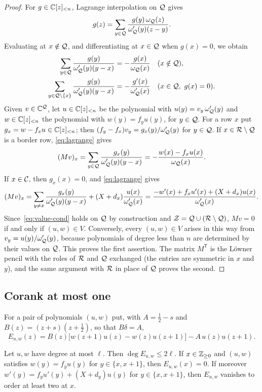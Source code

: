 \begin{proof}
For $g\in\mathbb{C}[z]_{<n}$, Lagrange interpolation on $\mathcal{Q}$ gives
\[
  g(z)=\sum_{y\in\mathcal{Q}}\frac{g(y)\,\omega_{\mathcal{Q}}(z)}{\omega_{\mathcal{Q}}'(y)(z-y)} .
\]
Evaluating at $x\notin\mathcal{Q}$, and differentiating at $x\in\mathcal{Q}$ when $g(x)=0$, we obtain
\begin{equation}\label{eq:lagrange}
\begin{aligned}
  \sum_{y\in\mathcal{Q}}\frac{g(y)}{\omega_{\mathcal{Q}}'(y)(y-x)}&=-\frac{g(x)}{\omega_{\mathcal{Q}}(x)}
  &&(x\notin\mathcal{Q}),\\
  \sum_{y\in\mathcal{Q}\setminus\{x\}}\frac{g(y)}{\omega_{\mathcal{Q}}'(y)(y-x)}&=-\frac{g'(x)}{\omega_{\mathcal{Q}}'(x)}
  &&(x\in\mathcal{Q},\ g(x)=0).
\end{aligned}
\end{equation}
Given $v\in\mathbb{C}^{\mathcal{Q}}$, let $u\in\mathbb{C}[z]_{<n}$ be the polynomial with $u(y)=v_y\,\omega_{\mathcal{Q}}'(y)$ and
$w\in\mathbb{C}[z]_{<n}$ the polynomial with $w(y)=f_yu(y)$, for $y\in\mathcal{Q}$. For a row $x$ put
$g_x=w-f_xu\in\mathbb{C}[z]_{<n}$; then $(f_y-f_x)v_y=g_x(y)/\omega_{\mathcal{Q}}'(y)$ for $y\in\mathcal{Q}$. If
$x\in\mathcal{R}\setminus\mathcal{Q}$ is a border row, \eqref{eq:lagrange} gives
\[(Mv)_x=\sum_{y\in\mathcal{Q}}\frac{g_x(y)}{\omega_{\mathcal{Q}}'(y)(y-x)}=-\frac{w(x)-f_xu(x)}{\omega_{\mathcal{Q}}(x)} .\]
If $x\in\mathcal{C}$, then $g_x(x)=0$, and \eqref{eq:lagrange} gives
\[(Mv)_x=\sum_{y\ne x}\frac{g_x(y)}{\omega_{\mathcal{Q}}'(y)(y-x)}+(X+d_x)\frac{u(x)}{\omega_{\mathcal{Q}}'(x)}
  =\frac{-w'(x)+f_xu'(x)+(X+d_x)u(x)}{\omega_{\mathcal{Q}}'(x)}.\]
Since~\eqref{eq:value-cond} holds on $\mathcal{Q}$ by construction and $\mathcal{Z}=\mathcal{Q}\cup(\mathcal{R}\setminus\mathcal{Q})$,
$Mv=0$ if and only if $(u,w)\in V$. Conversely, every $(u,w)\in V$ arises in this way from
$v_y=u(y)/\omega_{\mathcal{Q}}'(y)$, because polynomials of degree less than $n$ are determined by their
values on $\mathcal{Q}$. This proves the first assertion. The matrix $M^{\mathsf T}$ is the L\"owner
pencil with the roles of $\mathcal{R}$ and $\mathcal{Q}$ exchanged (the entries are symmetric in $x$ and $y$),
and the same argument with $\mathcal{R}$ in place of $\mathcal{Q}$ proves the second.
\end{proof}

\subsection{Corank at most one}\label{subsec:corank}

For a pair of polynomials $(u,w)$ put, with $A=\frac12-s$ and $B(z)=(z+s)(z+\frac12)$, so that
$B\delta=A$,
\[
  E_{u,w}(z)=B(z)\bigl[w(z+1)u(z)-w(z)u(z+1)\bigr]-A\,u(z)u(z+1).
\]

\begin{lemma}\label{lem:E-zeros}
Let $u,w$ have degree at most $\ell$. Then $\deg E_{u,w}\le2\ell$. If $x\in\mathbb{Z}_{\ge0}$ and $(u,w)$
satisfies $w(y)=f_yu(y)$ for $y\in\{x,x+1\}$, then $E_{u,w}(x)=0$. If moreover
$w'(y)=f_yu'(y)+(X+d_y)u(y)$ for $y\in\{x,x+1\}$, then $E_{u,w}$ vanishes to order at least two
at $x$.
\end{lemma}

